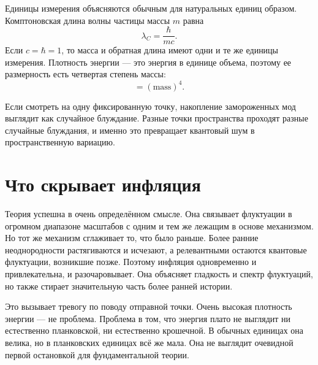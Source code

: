 Единицы измерения объясняются обычным для натуральных единиц образом. Комптоновская длина волны частицы массы \(m\) равна
\begin{equation}
\lambda_C=\frac{\hbar}{mc}.
\end{equation}
Если \(c=\hbar=1\), то масса и обратная длина имеют одни и те же единицы измерения. Плотность энергии — это энергия в единице объема, поэтому ее размерность есть четвертая степень массы:
\begin{equation}
[\rho]=(\mathrm{mass})^4.
\end{equation}

Если смотреть на одну фиксированную точку, накопление замороженных мод выглядит как случайное блуждание. Разные точки пространства проходят разные случайные блуждания, и именно это превращает квантовый шум в пространственную вариацию.

\begin{classroomqa}
\end{classroomqa}

\section{Что скрывает инфляция}

Теория успешна в очень определённом смысле. Она связывает флуктуации в огромном диапазоне масштабов с одним и тем же лежащим в основе механизмом. Но тот же механизм сглаживает то, что было раньше. Более ранние неоднородности растягиваются и исчезают, а релевантными остаются квантовые флуктуации, возникшие позже. Поэтому инфляция одновременно и привлекательна, и разочаровывает. Она объясняет гладкость и спектр флуктуаций, но также стирает значительную часть более ранней истории.

Это вызывает тревогу по поводу отправной точки. Очень высокая плотность энергии — не проблема. Проблема в том, что энергия плато не выглядит ни естественно планковской, ни естественно крошечной. В обычных единицах она велика, но в планковских единицах всё же мала. Она не выглядит очевидной первой остановкой для фундаментальной теории.

